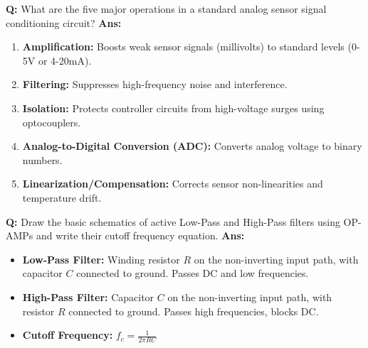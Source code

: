 \documentclass[10pt,a4paper,twocolumn]{article}
\begin{document}
\begin{tcolorbox}[
  colback=white,
  colframe=UnitColorOne,
  colbacktitle=gray!10!white,
  coltitle=black,
  fonttitle=\bfseries\sffamily\small,
  title={Unit I $\bullet$ Card 12: Signal Conditioning Blocks},
  boxrule=1.2pt,
  arc=2mm,
  outer arc=2mm,
  boxsep=1.5mm,
  top=1mm,
  bottom=1mm,
  left=1.5mm,
  right=1.5mm,
  before skip=2.5mm,
  after skip=2.5mm
]
\textbf{Q:} What are the five major operations in a standard analog sensor signal conditioning circuit?
\tcbline
\textbf{Ans:} \begin{enumerate}
  \item \textbf{Amplification:} Boosts weak sensor signals (millivolts) to standard levels (0-5V or 4-20mA).
  \item \textbf{Filtering:} Suppresses high-frequency noise and interference.
  \item \textbf{Isolation:} Protects controller circuits from high-voltage surges using optocouplers.
  \item \textbf{Analog-to-Digital Conversion (ADC):} Converts analog voltage to binary numbers.
  \item \textbf{Linearization/Compensation:} Corrects sensor non-linearities and temperature drift.
\end{enumerate}
\end{tcolorbox}


\begin{tcolorbox}[
  colback=white,
  colframe=UnitColorOne,
  colbacktitle=gray!10!white,
  coltitle=black,
  fonttitle=\bfseries\sffamily\small,
  title={Unit I $\bullet$ Card 13: Active Filters},
  boxrule=1.2pt,
  arc=2mm,
  outer arc=2mm,
  boxsep=1.5mm,
  top=1mm,
  bottom=1mm,
  left=1.5mm,
  right=1.5mm,
  before skip=2.5mm,
  after skip=2.5mm
]
\textbf{Q:} Draw the basic schematics of active Low-Pass and High-Pass filters using OP-AMPs and write their cutoff frequency equation.
\tcbline
\textbf{Ans:} \begin{itemize}
  \item   \textbf{Low-Pass Filter:} Winding resistor $R$ on the non-inverting input path, with capacitor $C$ connected to ground. Passes DC and low frequencies.
  \item   \textbf{High-Pass Filter:} Capacitor $C$ on the non-inverting input path, with resistor $R$ connected to ground. Passes high frequencies, blocks DC.
  \item   \textbf{Cutoff Frequency:} $f_c = \frac{1}{2\pi R C}$
\end{itemize}
\end{tcolorbox}
\end{document}

